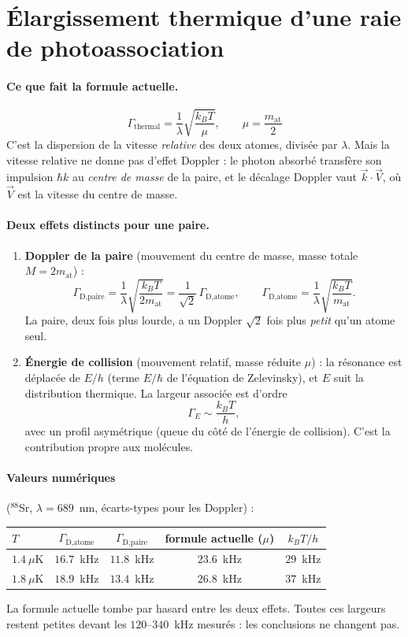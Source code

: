 \documentclass[11pt]{article}
\begin{document}
\section*{Élargissement thermique d'une raie de photoassociation}

\paragraph{Ce que fait la formule actuelle.}
\[
\Gamma_{\text{thermal}} = \frac{1}{\lambda}\sqrt{\frac{k_BT}{\mu}},\qquad \mu=\frac{m_{\text{at}}}{2}
\]
C'est la dispersion de la vitesse \emph{relative} des deux atomes, divisée par $\lambda$. Mais la vitesse relative ne donne pas d'effet Doppler :
le photon absorbé transfère son impulsion $\hbar k$ au \emph{centre de masse} de la paire, et le décalage Doppler vaut $\vec k\cdot\vec V$, où $\vec V$ est la vitesse du centre de masse.

\paragraph{Deux effets distincts pour une paire.}
\begin{enumerate}
\item \textbf{Doppler de la paire} (mouvement du centre de masse, masse totale $M=2m_{\text{at}}$) :
\[
\Gamma_{\text{D,paire}} = \frac{1}{\lambda}\sqrt{\frac{k_BT}{2m_{\text{at}}}}
= \frac{1}{\sqrt2}\,\Gamma_{\text{D,atome}},
\qquad \Gamma_{\text{D,atome}} = \frac{1}{\lambda}\sqrt{\frac{k_BT}{m_{\text{at}}}} .
\]
La paire, deux fois plus lourde, a un Doppler $\sqrt2$ fois plus \emph{petit} qu'un atome seul.
\item \textbf{Énergie de collision} (mouvement relatif, masse réduite $\mu$) : la résonance est déplacée de $E/h$ (terme $E/\hbar$ de l'équation de Zelevinsky), et $E$ suit la distribution thermique. La largeur associée est d'ordre
\[
\Gamma_E \sim \frac{k_BT}{h},
\]
avec un profil asymétrique (queue du côté de l'énergie de collision). C'est la contribution propre aux molécules.
\end{enumerate}

\paragraph{Valeurs numériques} ($^{88}$Sr, $\lambda=689$~nm, écarts-types pour les Doppler) :
\begin{center}
\begin{tabular}{lcccc}
\toprule
$T$ & $\Gamma_{\text{D,atome}}$ & $\Gamma_{\text{D,paire}}$ & formule actuelle ($\mu$) & $k_BT/h$ \\
\midrule
$1.4~\mu$K & $16.7$~kHz & $11.8$~kHz & $23.6$~kHz & $29$~kHz \\
$1.8~\mu$K & $18.9$~kHz & $13.4$~kHz & $26.8$~kHz & $37$~kHz \\
\bottomrule
\end{tabular}
\end{center}
La formule actuelle tombe par hasard entre les deux effets. Toutes ces largeurs restent petites devant les $120$--$340$~kHz mesurés : les conclusions ne changent pas.
\end{document}
